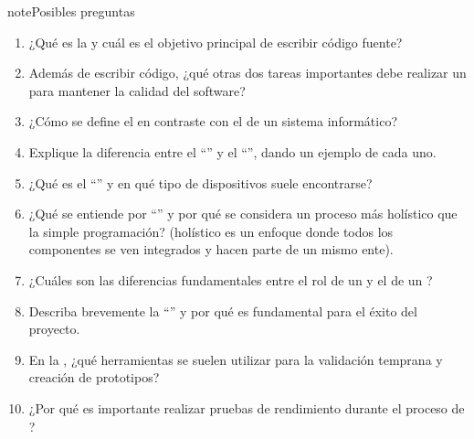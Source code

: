 \documentclass[letterpaper,10pt,spanish]{sphinxmanual}
\begin{document}
\begin{sphinxadmonition}{note}{Posibles preguntas}
\begin{enumerate}
%
\item {} 
\sphinxAtStartPar
¿Qué es la  y cuál es el objetivo principal de escribir código fuente?

\item {} 
\sphinxAtStartPar
Además de escribir código, ¿qué otras dos tareas importantes debe realizar un  para mantener la calidad del software?

\item {} 
\sphinxAtStartPar
¿Cómo se define el  en contraste con el  de un sistema informático?

\item {} 
\sphinxAtStartPar
Explique la diferencia entre el “” y el “”, dando un ejemplo de cada uno.

\item {} 
\sphinxAtStartPar
¿Qué es el “” y en qué tipo de dispositivos suele encontrarse?

\item {} 
\sphinxAtStartPar
¿Qué se entiende por “” y por qué se considera un proceso más holístico que la simple programación? (holístico es un enfoque donde todos los componentes se ven integrados y hacen parte de un mismo ente).

\item {} 
\sphinxAtStartPar
¿Cuáles son las diferencias fundamentales entre el rol de un  y el de un ?

\item {} 
\sphinxAtStartPar
Describa brevemente la “” y por qué es fundamental para el éxito del proyecto.

\item {} 
\sphinxAtStartPar
En la , ¿qué herramientas se suelen utilizar para la validación temprana y creación de prototipos?

\item {} 
\sphinxAtStartPar
¿Por qué es importante realizar pruebas de rendimiento durante el proceso de ?


\end{enumerate}
\end{sphinxadmonition}
\end{document}
